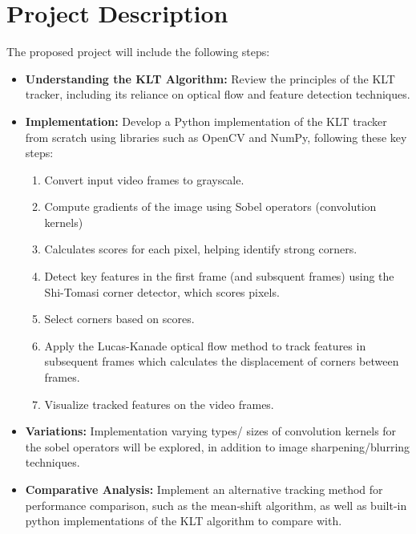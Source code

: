 \documentclass[journal]{IEEEtran}
\begin{document}
\section{Project Description}
The proposed project will include the following steps:
\begin{itemize}
    \item \textbf{Understanding the KLT Algorithm:} Review the principles of the KLT tracker, including its reliance on optical flow and feature detection techniques.
    \item \textbf{Implementation:} Develop a Python implementation of the KLT tracker from scratch using libraries such as OpenCV and NumPy, following these key steps:
    \begin{enumerate}
        \item Convert input video frames to grayscale.
        \item Compute gradients of the image using Sobel operators (convolution kernels)
        \item Calculates scores for each pixel, helping identify strong corners.
        \item Detect key features in the first frame (and subsquent frames) using the Shi-Tomasi corner detector, which scores pixels.
        \item Select corners based on scores.
        \item Apply the Lucas-Kanade optical flow method to track features in subsequent frames which calculates the displacement of corners between frames.
        \item Visualize tracked features on the video frames.
    \end{enumerate}
    \item \textbf{Variations:} Implementation varying types/ sizes of convolution kernels for the sobel operators will be explored, in addition to image sharpening/blurring techniques.
    \item \textbf{Comparative Analysis:} Implement an alternative tracking method for performance comparison, such as the mean-shift algorithm, as well as built-in python implementations of the KLT algorithm to compare with.
\end{itemize}

\end{document}
